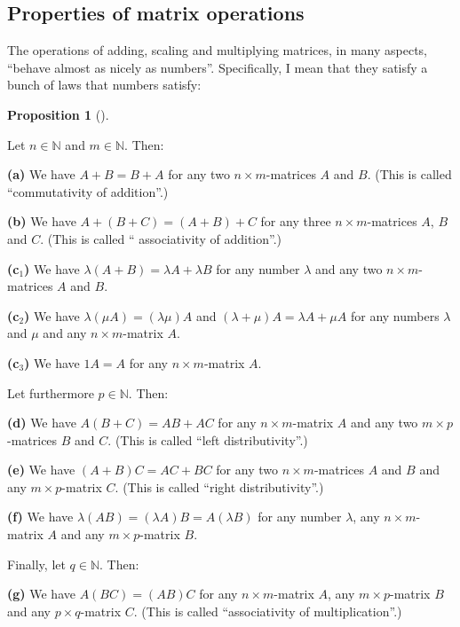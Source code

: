 \documentclass[numbers=enddot,12pt,final,onecolumn,notitlepage]{scrartcl}%
\theoremstyle{definition}
\newtheorem{prop}[theo]{Proposition}
\newenvironment{proposition}[1][]
{\begin{prop}[#1]\begin{leftbar}}
{\end{leftbar}\end{prop}}
\begin{document}
\subsection{Properties of matrix operations}

The operations of adding, scaling and multiplying matrices, in many aspects,
\textquotedblleft behave almost as nicely as numbers\textquotedblright.
Specifically, I mean that they satisfy a bunch of laws that numbers satisfy:

\begin{proposition}
\label{prop.matrix-laws.1}Let $n\in\mathbb{N}$ and $m\in\mathbb{N}$. Then:

\textbf{(a)} We have $A+B=B+A$ for any two $n\times m$-matrices $A$ and $B$.
(This is called \textquotedblleft commutativity of addition\textquotedblright.)

\textbf{(b)} We have $A+\left(  B+C\right)  =\left(  A+B\right)  +C$ for any
three $n\times m$-matrices $A$, $B$ and $C$. (This is called \textquotedblleft
associativity of addition\textquotedblright.)

\textbf{(c}$_{1}$\textbf{)} We have $\lambda\left(  A+B\right)  =\lambda
A+\lambda B$ for any number $\lambda$ and any two $n\times m$-matrices $A$ and
$B$.

\textbf{(c}$_{2}$\textbf{)} We have $\lambda\left(  \mu A\right)  =\left(
\lambda\mu\right)  A$ and $\left(  \lambda+\mu\right)  A=\lambda A+\mu A$ for
any numbers $\lambda$ and $\mu$ and any $n\times m$-matrix $A$.

\textbf{(c}$_{3}$\textbf{)} We have $1A=A$ for any $n\times m$-matrix $A$.

Let furthermore $p\in\mathbb{N}$. Then:

\textbf{(d)} We have $A\left(  B+C\right)  =AB+AC$ for any $n\times m$-matrix
$A$ and any two $m\times p$-matrices $B$ and $C$. (This is called
\textquotedblleft left distributivity\textquotedblright.)

\textbf{(e)} We have $\left(  A+B\right)  C=AC+BC$ for any two $n\times
m$-matrices $A$ and $B$ and any $m\times p$-matrix $C$. (This is called
\textquotedblleft right distributivity\textquotedblright.)

\textbf{(f)} We have $\lambda\left(  AB\right)  =\left(  \lambda A\right)
B=A\left(  \lambda B\right)  $ for any number $\lambda$, any $n\times
m$-matrix $A$ and any $m\times p$-matrix $B$.

Finally, let $q\in\mathbb{N}$. Then:

\textbf{(g)} We have $A\left(  BC\right)  =\left(  AB\right)  C$ for any
$n\times m$-matrix $A$, any $m\times p$-matrix $B$ and any $p\times q$-matrix
$C$. (This is called \textquotedblleft associativity of
multiplication\textquotedblright.)
\end{proposition}
\end{document}
